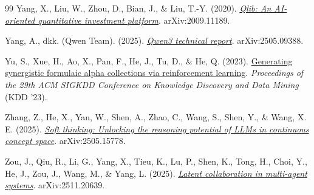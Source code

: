 \begin{thebibliography}{99}
Yang, X., Liu, W., Zhou, D., Bian, J., \& Liu, T.-Y. (2020).
\href{https://arxiv.org/abs/2009.11189}{\emph{Qlib: An AI-oriented quantitative
investment platform}}. arXiv:2009.11189.

Yang, A., dkk. (Qwen Team). (2025).
\href{https://arxiv.org/abs/2505.09388}{\emph{Qwen3 technical report}}.
arXiv:2505.09388.

Yu, S., Xue, H., Ao, X., Pan, F., He, J., Tu, D., \& He, Q. (2023).
\href{https://arxiv.org/abs/2306.12964}{Generating synergistic formulaic alpha
collections via reinforcement learning}. \emph{Proceedings of the 29th ACM
SIGKDD Conference on Knowledge Discovery and Data Mining} (KDD '23).

Zhang, Z., He, X., Yan, W., Shen, A., Zhao, C., Wang, S., Shen, Y., \& Wang,
X. E. (2025).
\href{https://arxiv.org/abs/2505.15778}{\emph{Soft thinking: Unlocking the
reasoning potential of LLMs in continuous concept space}}. arXiv:2505.15778.

Zou, J., Qiu, R., Li, G., Yang, X., Tieu, K., Lu, P., Shen, K., Tong, H.,
Choi, Y., He, J., Zou, J., Wang, M., \& Yang, L. (2025).
\href{https://arxiv.org/abs/2511.20639}{\emph{Latent collaboration in multi-agent
systems}}. arXiv:2511.20639.

\end{thebibliography}

